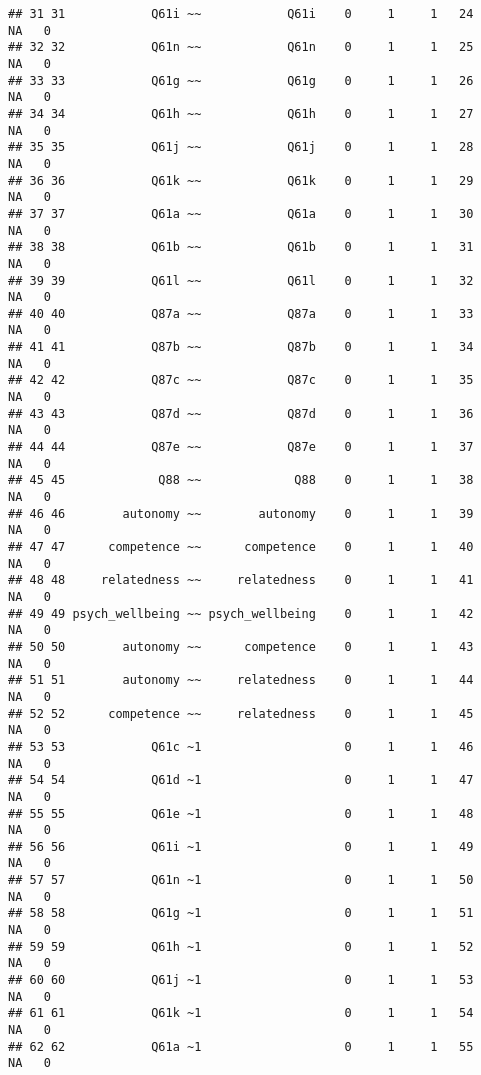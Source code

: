 \documentclass[
]{article}
\begin{document}
\begin{verbatim}
## 31 31            Q61i ~~            Q61i    0     1     1   24     NA   0      
## 32 32            Q61n ~~            Q61n    0     1     1   25     NA   0      
## 33 33            Q61g ~~            Q61g    0     1     1   26     NA   0      
## 34 34            Q61h ~~            Q61h    0     1     1   27     NA   0      
## 35 35            Q61j ~~            Q61j    0     1     1   28     NA   0      
## 36 36            Q61k ~~            Q61k    0     1     1   29     NA   0      
## 37 37            Q61a ~~            Q61a    0     1     1   30     NA   0      
## 38 38            Q61b ~~            Q61b    0     1     1   31     NA   0      
## 39 39            Q61l ~~            Q61l    0     1     1   32     NA   0      
## 40 40            Q87a ~~            Q87a    0     1     1   33     NA   0      
## 41 41            Q87b ~~            Q87b    0     1     1   34     NA   0      
## 42 42            Q87c ~~            Q87c    0     1     1   35     NA   0      
## 43 43            Q87d ~~            Q87d    0     1     1   36     NA   0      
## 44 44            Q87e ~~            Q87e    0     1     1   37     NA   0      
## 45 45             Q88 ~~             Q88    0     1     1   38     NA   0      
## 46 46        autonomy ~~        autonomy    0     1     1   39     NA   0      
## 47 47      competence ~~      competence    0     1     1   40     NA   0      
## 48 48     relatedness ~~     relatedness    0     1     1   41     NA   0      
## 49 49 psych_wellbeing ~~ psych_wellbeing    0     1     1   42     NA   0      
## 50 50        autonomy ~~      competence    0     1     1   43     NA   0      
## 51 51        autonomy ~~     relatedness    0     1     1   44     NA   0      
## 52 52      competence ~~     relatedness    0     1     1   45     NA   0      
## 53 53            Q61c ~1                    0     1     1   46     NA   0      
## 54 54            Q61d ~1                    0     1     1   47     NA   0      
## 55 55            Q61e ~1                    0     1     1   48     NA   0      
## 56 56            Q61i ~1                    0     1     1   49     NA   0      
## 57 57            Q61n ~1                    0     1     1   50     NA   0      
## 58 58            Q61g ~1                    0     1     1   51     NA   0      
## 59 59            Q61h ~1                    0     1     1   52     NA   0      
## 60 60            Q61j ~1                    0     1     1   53     NA   0      
## 61 61            Q61k ~1                    0     1     1   54     NA   0      
## 62 62            Q61a ~1                    0     1     1   55     NA   0      

\end{verbatim}
\end{document}
